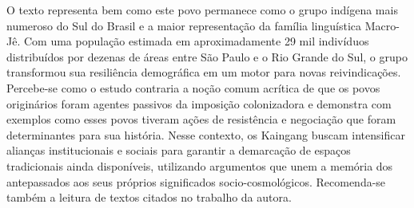 \documentclass[12pt, a4paper]{article}
\begin{document}
O texto representa bem como este povo permanece como o grupo indígena mais numeroso do Sul do Brasil e a maior representação da família linguística Macro-Jê. Com uma população estimada em aproximadamente 29 mil indivíduos distribuídos por dezenas de áreas entre São Paulo e o Rio Grande do Sul, o grupo transformou sua resiliência demográfica em um motor para novas reivindicações. Percebe-se como o estudo contraria a noção comum acrítica de que os povos originários foram agentes passivos da imposição colonizadora e demonstra com exemplos como esses povos tiveram ações de resistência e negociação que foram determinantes para sua história. Nesse contexto, os Kaingang buscam intensificar alianças institucionais e sociais para garantir a demarcação de espaços tradicionais ainda disponíveis, utilizando argumentos que unem a memória dos antepassados aos seus próprios significados socio-cosmológicos. Recomenda-se também a leitura de textos citados no trabalho da autora.

%
%
%
%
%
\end{document}
